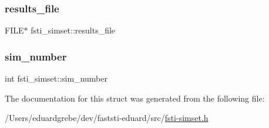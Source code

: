 \mbox{\label{structfsti__simset_aa8df01cdf345dbdc9a3ef68e655e4c6e}} 
\subsubsection{\texorpdfstring{results\+\_\+file}{results\_file}}
{\footnotesize\ttfamily F\+I\+LE$\ast$ fsti\+\_\+simset\+::results\+\_\+file}

\mbox{\label{structfsti__simset_ac00dba7fb65ecba47a36ef06074dd36a}} 
\subsubsection{\texorpdfstring{sim\+\_\+number}{sim\_number}}
{\footnotesize\ttfamily int fsti\+\_\+simset\+::sim\+\_\+number}



The documentation for this struct was generated from the following file\+:\begin{DoxyCompactItemize}
\item 
/\+Users/eduardgrebe/dev/faststi-\/eduard/src/\mbox{\hyperlink{fsti-simset_8h}{fsti-\/simset.\+h}}\end{DoxyCompactItemize}
